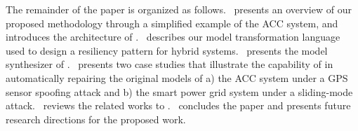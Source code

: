 The remainder of the paper is organized as follows.~ presents an overview of our proposed methodology through a simplified example of the ACC system, and introduces the architecture of \toolreaffirm.~ describes our model transformation language used to design a resiliency pattern for hybrid systems.~ presents the model synthesizer of \toolreaffirm.~ presents two case studies that illustrate the capability of \toolreaffirm in automatically repairing the original models of a) the ACC system under a GPS sensor spoofing attack and b) the smart power grid system under a sliding-mode attack.~ reviews the related works to \toolreaffirm.~ concludes the paper and presents future research directions for the proposed work.





